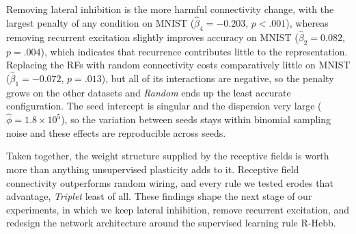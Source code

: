 Removing lateral inhibition is the more harmful connectivity change, with the largest
penalty of any condition on MNIST ($\hat{\beta}_4 = -0.203$, $p<.001$), whereas removing
recurrent excitation slightly improves accuracy on MNIST ($\hat{\beta}_2 = 0.082$,
$p = .004$), which indicates that recurrence contributes little to the representation.
Replacing the RFs with random connectivity costs comparatively little on MNIST
($\hat{\beta}_1 = -0.072$, $p = .013$), but all of its interactions are negative, so the
penalty grows on the other datasets and \textit{Random} ends up the least accurate
configuration. The seed intercept is singular and the dispersion very large
($\hat{\phi} = 1.8\times10^{5}$), so the variation between seeds stays within binomial
sampling noise and these effects are reproducible across seeds.

Taken together, the weight structure supplied by the receptive fields is worth more than
anything unsupervised plasticity adds to it. Receptive field connectivity outperforms random
wiring, and every rule we tested erodes that advantage, \textit{Triplet} least of all. These
findings shape the next stage of our experiments, in which we keep lateral inhibition,
remove recurrent excitation, and redesign the network architecture around the supervised
learning rule R-Hebb.
